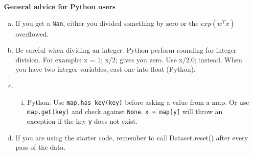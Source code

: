 \documentclass[12pt]{article}
\begin{document}
{\bf General advice for Python users}
\begin{enumerate}[(a)]
  \item If you get a \texttt{Nan}, either you divided something by zero or the $exp(w^Tx)$ overflowed. 
  \item Be careful when dividing an integer. Python perform rounding for integer division. For example: x = 1; x/2; gives you zero. Use x/2.0; instead. When you have two integer variables, cast one into float (Python).  
  \item
    \begin{enumerate}[(i)]
      \item Python: Use \texttt{map.has\_key(key)} before asking a value from a map. Or use \texttt{map.get(key)} and check against \texttt{None}. \texttt{x = map[y]} will throw an exception if the key \texttt{y} does not exist.
    \end{enumerate}
  \item If you are using the starter code, remember to call Dataset.reset() after every pass of the data.
\end{enumerate}
\end{document}
